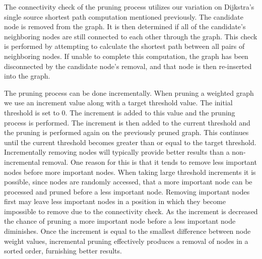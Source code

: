 The connectivity check of the pruning process utilizes our variation on Dijkstra's single source shortest path computation mentioned previously. The candidate node is removed from the graph.  It is then determined if all of the candidate's neighboring nodes are still connected to each other through the graph.  This check is performed by attempting to calculate the shortest path between all pairs of neighboring nodes.  If unable to complete this computation, the graph has been disconnected by the candidate node's removal, and that node is then re-inserted into the graph. 

The pruning process can be done incrementally. When pruning a weighted graph we use an increment value along with a target threshold value.  The initial threshold is set to 0. The increment is added to this value and the pruning process is performed. The increment is then added to the current threshold and the pruning is performed again on the previously pruned graph. This continues until the current threshold becomes greater than or equal to the target threshold.  Incrementally removing nodes will typically provide better results than a non-incremental removal.  One reason for this is that it tends to remove less important nodes before more important nodes.  When taking large threshold increments it is possible, since nodes are randomly accessed, that a more important node can be processed and pruned before a less important node.  Removing important nodes first may leave less important nodes in a position in which they become impossible to remove due to the connectivity check.  As the increment is decreased the chance of pruning a more important node before a less important node diminishes. Once the increment is equal to the smallest difference between node weight values, incremental pruning effectively produces a removal of nodes in a sorted order, furnishing better results.



